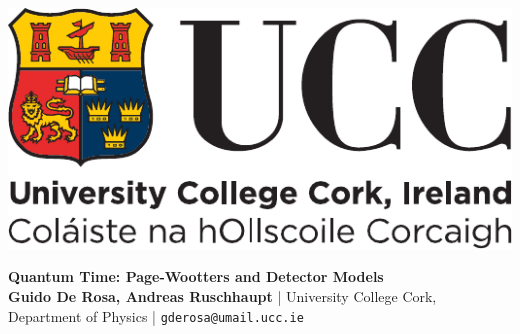 \documentclass[landscape]{a0poster}
\begin{document}
\begin{minipage}[c]{0.2\linewidth}%
\includegraphics[width=0.5\linewidth]{ucc_logo.pdf}\\[0.0cm]
\end{minipage}%
\begin{minipage}[c]{0.8\linewidth}\begin{flushright}%
\huge\color{NavyBlue}\textbf{Quantum Time: Page-Wootters and Detector Models}%
\color{Black}%
\\[0.5cm]
  \large
  \textbf{Guido De Rosa, Andreas Ruschhaupt} |
  University College Cork, Department of Physics |
  \texttt{gderosa@umail.ucc.ie}
\end{flushright}\end{minipage}%
%
%
%
%
\end{document}
